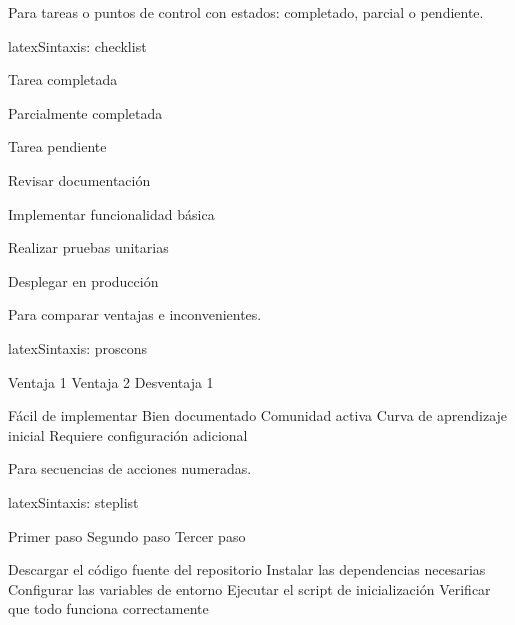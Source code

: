 Para tareas o puntos de control con estados: completado, parcial o pendiente.

\begin{codigosimple}{latex}{Sintaxis: checklist}
\begin{checklist}
  \item[\checked] Tarea completada
  \item[\partialchecked] Parcialmente completada
  \item[\unchecked] Tarea pendiente
\end{checklist}
\end{codigosimple}

\begin{checklist}
  \item[\checked] Revisar documentación
  \item[\checked] Implementar funcionalidad básica
  \item[\partialchecked] Realizar pruebas unitarias
  \item[\unchecked] Desplegar en producción
\end{checklist}

Para comparar ventajas e inconvenientes.

\begin{codigosimple}{latex}{Sintaxis: proscons}
\begin{proscons}
  \pro Ventaja 1
  \pro Ventaja 2
  \con Desventaja 1
\end{proscons}
\end{codigosimple}

\begin{proscons}
  \pro Fácil de implementar
  \pro Bien documentado
  \pro Comunidad activa
  \con Curva de aprendizaje inicial
  \con Requiere configuración adicional
\end{proscons}

Para secuencias de acciones numeradas.

\begin{codigosimple}{latex}{Sintaxis: steplist}
\begin{steplist}
  \step Primer paso
  \step Segundo paso
  \step Tercer paso
\end{steplist}
\end{codigosimple}

\begin{steplist}
  \step Descargar el código fuente del repositorio
  \step Instalar las dependencias necesarias
  \step Configurar las variables de entorno
  \step Ejecutar el script de inicialización
  \step Verificar que todo funciona correctamente
\end{steplist}

